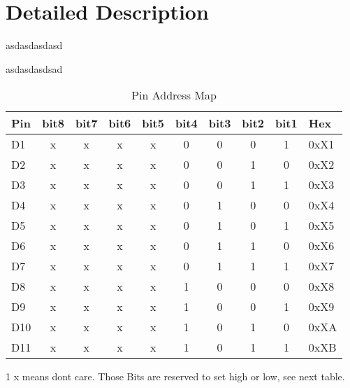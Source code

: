\documentclass[10pt]{datasheet}
\begin{document}
\newpage
\twocolumn
\section{Detailed Description}

asdasdasdasd

\vfill\break
asdasdasdsad

\onecolumn

\begin{table}[h]
\begin{threeparttable}
\caption{Pin Address Map}
\begin{tabularx}{\textwidth}{l | c | c | c | c | c | c | c | c | X}
    \thickhline
    \textbf{Pin}	& \textbf{bit8}	& \textbf{bit7}	& \textbf{bit6}	& \textbf{bit5}	& \textbf{bit4}	& \textbf{bit3}	& \textbf{bit2}	& \textbf{bit1} 	& \textbf{Hex} \\
    \hline
    D1	&	x	&	x	&	x	&	x	&	0	&	0	&	0	&	1 	& 0xX1 \\
    \hline
    D2	&	x	&	x	&	x	&	x	&	0	&	0	&	1	&	0	& 0xX2 \\
    \hline
    D3	&	x	&	x	&	x	&	x	&	0	&	0	&	1	&	1	& 0xX3 \\
    \hline
    D4	&	x	&	x	&	x	&	x	&	0	&	1	&	0	&	0	& 0xX4 \\
    \hline
    D5	&	x	&	x	&	x	&	x	&	0	&	1	&	0	&	1	& 0xX5 \\
    \hline
    D6	&	x	&	x	&	x	&	x	&	0	&	1	&	1	&	0	& 0xX6 \\
    \hline
    D7	&	x	&	x	&	x	&	x	&	0	&	1	&	1	&	1	& 0xX7 \\
    \hline
    D8	&	x	&	x	&	x	&	x	&	1	&	0	&	0	&	0	& 0xX8 \\
    \hline
    D9	&	x	&	x	&	x	&	x	&	1	&	0	&	0	&	1	& 0xX9 \\
    \hline
    D10	&	x	&	x	&	x	&	x	&	1	&	0	&	1	&	0	& 0xXA \\
    \hline
    D11	&	x	&	x	&	x	&	x	&	1	&	0	&	1	&	1	& 0xXB \\
\end{tabularx}
\begin{tablenotes}
\item[1]{x means dont care. Those Bits are reserved to set high or low, see next table.}
\end{tablenotes}
\end{threeparttable}
\end{table}
\end{document}
